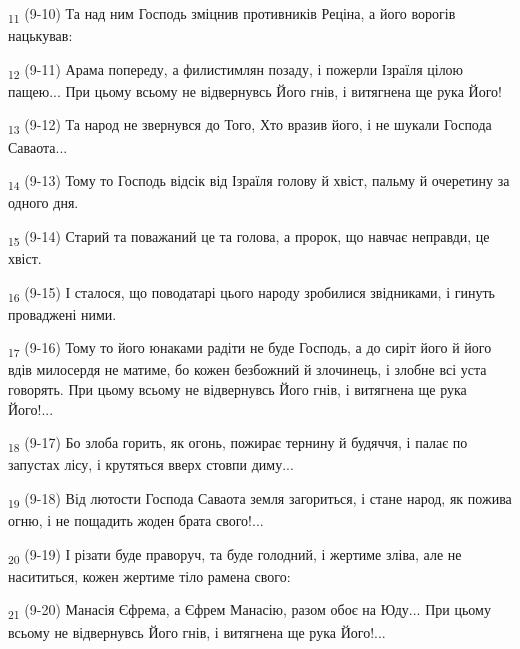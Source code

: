 \begin{tcolorbox}
\textsubscript{11} (9-10) Та над ним Господь зміцнив противників Реціна, а його ворогів нацькував:
\end{tcolorbox}
\begin{tcolorbox}
\textsubscript{12} (9-11) Арама попереду, а филистимлян позаду, і пожерли Ізраїля цілою пащею... При цьому всьому не відвернувсь Його гнів, і витягнена ще рука Його!
\end{tcolorbox}
\begin{tcolorbox}
\textsubscript{13} (9-12) Та народ не звернувся до Того, Хто вразив його, і не шукали Господа Саваота...
\end{tcolorbox}
\begin{tcolorbox}
\textsubscript{14} (9-13) Тому то Господь відсік від Ізраїля голову й хвіст, пальму й очеретину за одного дня.
\end{tcolorbox}
\begin{tcolorbox}
\textsubscript{15} (9-14) Старий та поважаний це та голова, а пророк, що навчає неправди, це хвіст.
\end{tcolorbox}
\begin{tcolorbox}
\textsubscript{16} (9-15) І сталося, що поводатарі цього народу зробилися звідниками, і гинуть проваджені ними.
\end{tcolorbox}
\begin{tcolorbox}
\textsubscript{17} (9-16) Тому то його юнаками радіти не буде Господь, а до сиріт його й його вдів милосердя не матиме, бо кожен безбожний й злочинець, і злобне всі уста говорять. При цьому всьому не відвернувсь Його гнів, і витягнена ще рука Його!...
\end{tcolorbox}
\begin{tcolorbox}
\textsubscript{18} (9-17) Бо злоба горить, як огонь, пожирає тернину й будяччя, і палає по запустах лісу, і крутяться вверх стовпи диму...
\end{tcolorbox}
\begin{tcolorbox}
\textsubscript{19} (9-18) Від лютости Господа Саваота земля загориться, і стане народ, як пожива огню, і не пощадить жоден брата свого!...
\end{tcolorbox}
\begin{tcolorbox}
\textsubscript{20} (9-19) І різати буде праворуч, та буде голодний, і жертиме зліва, але не насититься, кожен жертиме тіло рамена свого:
\end{tcolorbox}
\begin{tcolorbox}
\textsubscript{21} (9-20) Манасія Єфрема, а Єфрем Манасію, разом обоє на Юду... При цьому всьому не відвернувсь Його гнів, і витягнена ще рука Його!...
\end{tcolorbox}
